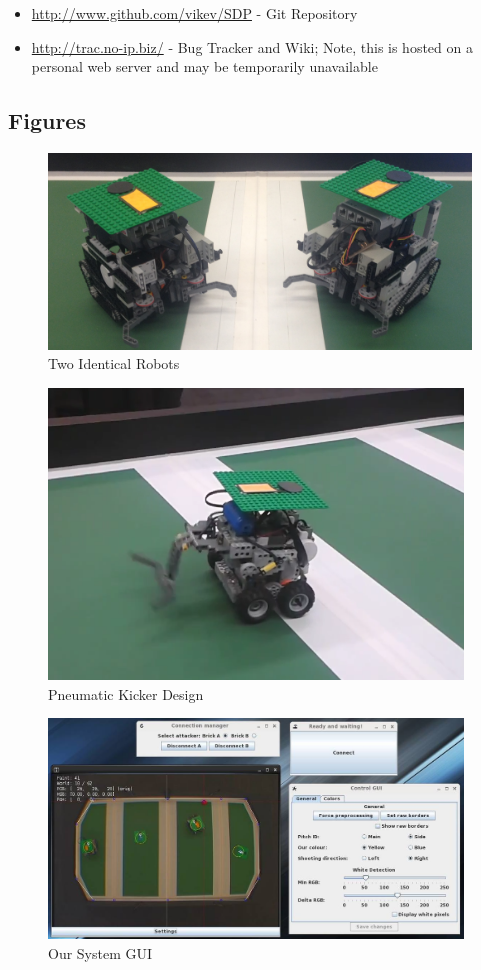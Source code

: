 \documentclass[a4paper,11pt]{article}
\begin{document}
\begin{itemize}
	\item \url{http://www.github.com/vikev/SDP} - Git Repository
	\item \url{http://trac.no-ip.biz/} - Bug Tracker and Wiki; Note, this is hosted on a personal web server and may be temporarily unavailable
\end{itemize}

\subsection{Figures}

\begin{figure}[p]
    \centering
    \includegraphics[width=130mm]{both_robots_cropped.jpg}
    \caption{Two Identical Robots}
\end{figure}

\begin{figure}[p]
    \centering
    \includegraphics[width=110mm]{pneumatic.png}
    \caption{Pneumatic Kicker Design}
\end{figure}

\begin{figure}[p]
    \centering
    \includegraphics[width=110mm]{system.jpg}
    \caption{Our System GUI}
\end{figure}
\end{document}
